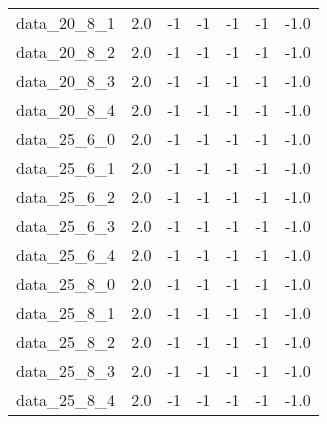 \begin{tabular}{rrrrrrr}
  data\_20\_8\_1 & 2.0 & -1 & -1 & -1 & -1 & -1.0 \\
  data\_20\_8\_2 & 2.0 & -1 & -1 & -1 & -1 & -1.0 \\
  data\_20\_8\_3 & 2.0 & -1 & -1 & -1 & -1 & -1.0 \\
  data\_20\_8\_4 & 2.0 & -1 & -1 & -1 & -1 & -1.0 \\
  data\_25\_6\_0 & 2.0 & -1 & -1 & -1 & -1 & -1.0 \\
  data\_25\_6\_1 & 2.0 & -1 & -1 & -1 & -1 & -1.0 \\
  data\_25\_6\_2 & 2.0 & -1 & -1 & -1 & -1 & -1.0 \\
  data\_25\_6\_3 & 2.0 & -1 & -1 & -1 & -1 & -1.0 \\
  data\_25\_6\_4 & 2.0 & -1 & -1 & -1 & -1 & -1.0 \\
  data\_25\_8\_0 & 2.0 & -1 & -1 & -1 & -1 & -1.0 \\
  data\_25\_8\_1 & 2.0 & -1 & -1 & -1 & -1 & -1.0 \\
  data\_25\_8\_2 & 2.0 & -1 & -1 & -1 & -1 & -1.0 \\
  data\_25\_8\_3 & 2.0 & -1 & -1 & -1 & -1 & -1.0 \\
  data\_25\_8\_4 & 2.0 & -1 & -1 & -1 & -1 & -1.0 \\\hline
\end{tabular}

